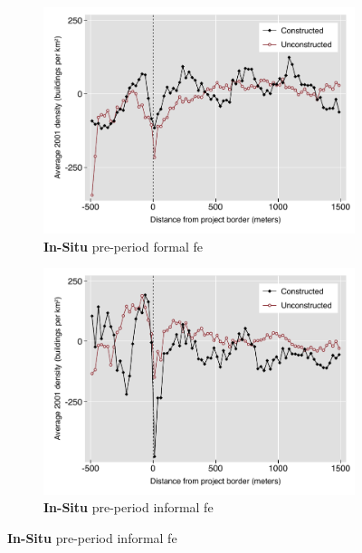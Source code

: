 \documentclass[12pt]{article}
\begin{document}
\begin{figure}
\begin{subfigure}[b]{0.48\textwidth}
        \end{subfigure}
        \begin{subfigure}[b]{0.48\textwidth}
                    \caption[Network2]%
            {{\footnotesize \textbf{In-Situ} pre-period formal fe }}   
            \label{fig:prefor}
            \centering
            \includegraphics[width=\textwidth,trim={0.3cm .3cm 0.1cm 0cm}, clip=true]{figures/bblu_for_fe_pre_pre_means_4_2_spk.pdf}

        \end{subfigure}
        \hfill
        \begin{subfigure}[b]{0.48\textwidth}  
                    \caption[]%
            {{\footnotesize \textbf{In-Situ} pre-period informal fe }}     
            \label{fig:preinf}
            \centering 
            \includegraphics[width=\textwidth,trim={0.3cm .3cm 0.1cm 0cm}, clip=true]{figures/bblu_inf_fe_pre_pre_means_4_2_spk.pdf}


\end{subfigure}
\end{figure}
\end{document}
